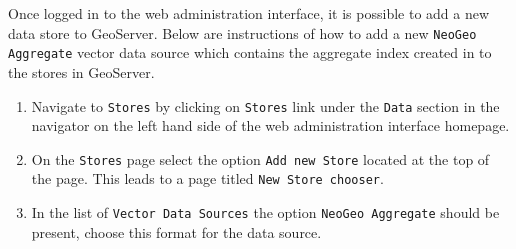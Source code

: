 
Once logged in to the web administration interface, it is possible to add a
new data store to GeoServer. Below are instructions of how to add a new
\lstinline|NeoGeo Aggregate| vector data source which contains the
aggregate index created in  to the stores in
GeoServer.

\begin{enumerate}
	\item Navigate to \lstinline|Stores| by clicking on \lstinline|Stores| link under the \lstinline|Data| section in the navigator on the left hand side of the web administration interface homepage.
	\item On the \lstinline|Stores| page select the option \lstinline|Add new Store| located at the top of the page. This leads to a page titled \lstinline|New Store chooser|.
	\item In the list of \lstinline|Vector Data Sources| the option \lstinline|NeoGeo Aggregate| should be present, choose this format for the data source.  
\end{enumerate}

